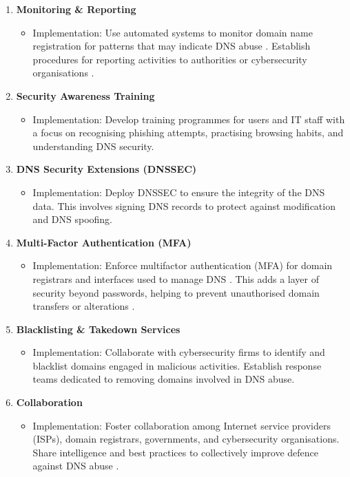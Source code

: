 \begin{enumerate}
    \item \textbf{Monitoring \& Reporting}
    \begin{itemize}
        \item Implementation: Use automated systems to monitor domain name registration for patterns that may indicate DNS abuse \cite{icannndnssec}. Establish procedures for reporting activities to authorities or cybersecurity organisations \cite{lucas2021tls}.
    \end{itemize}
    \item \textbf{Security Awareness Training}
    \begin{itemize}
        \item Implementation: Develop training programmes for users and IT staff with a focus on recognising phishing attempts, practising browsing habits, and understanding DNS security.
    \end{itemize}
    \item \textbf{DNS Security Extensions (DNSSEC)}
    \begin{itemize}
        \item Implementation: Deploy DNSSEC to ensure the integrity of the DNS data. This involves signing DNS records to protect against modification and DNS spoofing.
    \end{itemize}
    \item \textbf{Multi-Factor Authentication (MFA)}
    \begin{itemize}
        \item Implementation: Enforce multifactor authentication (MFA) for domain registrars and interfaces used to manage DNS \cite{icannndnssec}. This adds a layer of security beyond passwords, helping to prevent unauthorised domain transfers or alterations \cite{moghaddam2014ecco}.
    \end{itemize}
    \item \textbf{Blacklisting \& Takedown Services}
    \begin{itemize}
        \item Implementation: Collaborate with cybersecurity firms to identify and blacklist domains engaged in malicious activities. Establish response teams dedicated to removing domains involved in DNS abuse.
    \end{itemize}
    \item \textbf{Collaboration}
    \begin{itemize}
        \item Implementation: Foster collaboration among Internet service providers (ISPs), domain registrars, governments, and cybersecurity organisations. Share intelligence and best practices to collectively improve defence against DNS abuse \cite{skopik2017collaborative}.

\end{itemize}
\end{enumerate}
